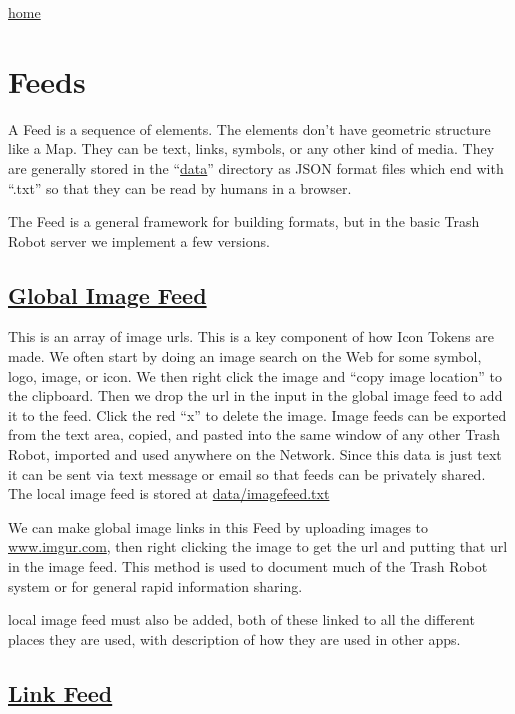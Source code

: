 \href{index.html}{home}

\section{Feeds}\label{feeds}

A Feed is a sequence of elements. The elements don't have geometric
structure like a Map. They can be text, links, symbols, or any other
kind of media. They are generally stored in the ``\href{data/}{data}''
directory as JSON format files which end with ``.txt'' so that they can
be read by humans in a browser.

The Feed is a general framework for building formats, but in the basic
Trash Robot server we implement a few versions.

\subsection{\texorpdfstring{\href{globalimagefeed.html}{Global Image
Feed}}{Global Image Feed}}\label{global-image-feed}

This is an array of image urls. This is a key component of how Icon
Tokens are made. We often start by doing an image search on the Web for
some symbol, logo, image, or icon. We then right click the image and
``copy image location'' to the clipboard. Then we drop the url in the
input in the global image feed to add it to the feed. Click the red
``x'' to delete the image. Image feeds can be exported from the text
area, copied, and pasted into the same window of any other Trash Robot,
imported and used anywhere on the Network. Since this data is just text
it can be sent via text message or email so that feeds can be privately
shared. The local image feed is stored at \url{data/imagefeed.txt}

We can make global image links in this Feed by uploading images to
\href{https://imgur.com/}{www.imgur.com}, then right clicking the image
to get the url and putting that url in the image feed. This method is
used to document much of the Trash Robot system or for general rapid
information sharing.

local image feed must also be added, both of these linked to all the different places they are used, with description of how they are used in other apps. 

\subsection{\texorpdfstring{\href{linkfeed.html}{Link
Feed}}{Link Feed}}\label{link-feed}

